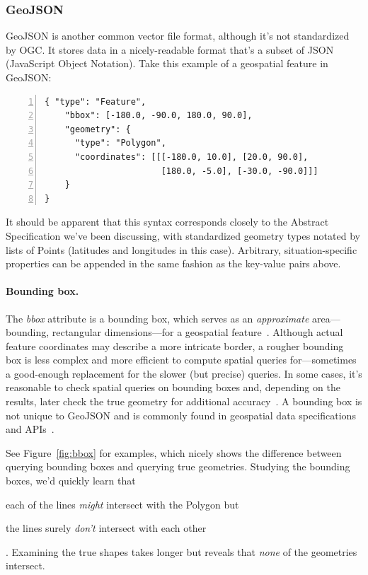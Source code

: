 \subsubsection{GeoJSON}
GeoJSON is another common vector file format, although it's not standardized by OGC. It stores data in a nicely-readable format that's a subset of JSON (JavaScript Object Notation). Take this example of a geospatial feature in GeoJSON:

\begin{Verbatim}[samepage=true,baselinestretch=1,numbers=left,xleftmargin=12mm]
{ "type": "Feature",
    "bbox": [-180.0, -90.0, 180.0, 90.0],
    "geometry": {
      "type": "Polygon",
      "coordinates": [[[-180.0, 10.0], [20.0, 90.0],
                       [180.0, -5.0], [-30.0, -90.0]]]
    }
}
\end{Verbatim}

It should be apparent that this syntax corresponds closely to the Abstract Specification we've been discussing, with standardized geometry types notated by lists of Points (latitudes and longitudes in this case). Arbitrary, situation-specific properties can be appended in the same fashion as the key-value pairs above.

\paragraph{Bounding box.}
The \textit{bbox} attribute is a bounding box, which serves as an \textit{approximate} area---bounding, rectangular dimensions---for a geospatial feature~\cite{Boundless}. Although actual feature coordinates may describe a more intricate border, a rougher bounding box is less complex and more efficient to compute spatial queries for---sometimes a good-enough replacement for the slower (but precise) queries. In some cases, it's reasonable to check spatial queries on bounding boxes and, depending on the results, later check the true geometry for additional accuracy~\cite{Boundless}. A bounding box is not unique to GeoJSON and is commonly found in geospatial data specifications and APIs~\cite{Boundless}. 

See Figure~\ref{fig:bbox} for examples, which nicely shows the difference between querying bounding boxes and querying true geometries. Studying the bounding boxes, we'd quickly learn that \begin{enumerate*}[label=\itshape\alph*\upshape)]
\item each of the lines \textit{might} intersect with the Polygon but
\item the lines surely \textit{don't} intersect with each other
\end{enumerate*}. Examining the true shapes takes longer but reveals that \textit{none} of the geometries intersect.

